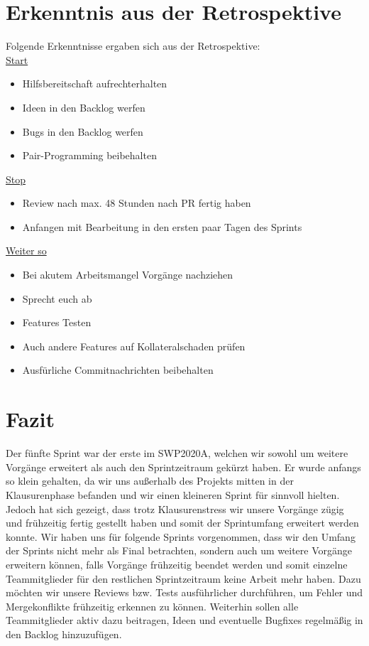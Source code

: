 \documentclass[12pt,a4paper, oneside]{article}
\begin{document}
    \section{Erkenntnis aus der Retrospektive}
    Folgende Erkenntnisse ergaben sich aus der Retrospektive:\\

    \underline{Start}
    \begin{itemize}
        \item Hilfsbereitschaft aufrechterhalten
        \item Ideen in den Backlog werfen
        \item Bugs in den Backlog werfen
        \item Pair-Programming beibehalten
        \\
    \end{itemize}

    \underline{Stop}
    \begin{itemize}
        \item Review nach max. 48 Stunden nach PR fertig haben
        \item Anfangen mit Bearbeitung in den ersten paar Tagen des Sprints
        \\
    \end{itemize}

    \underline{Weiter so}
    \begin{itemize}
        \item Bei akutem Arbeitsmangel Vorgänge nachziehen
        \item Sprecht euch ab
        \item Features Testen
        \item Auch andere Features auf Kollateralschaden prüfen
        \item Ausfürliche Commitnachrichten beibehalten
        \\
    \end{itemize}


    \section{Fazit}
    Der fünfte Sprint war der erste im SWP2020A, welchen wir sowohl um weitere Vorgänge erweitert als auch den Sprintzeitraum gekürzt haben. Er wurde anfangs so klein gehalten, da wir uns außerhalb des Projekts mitten in der Klausurenphase befanden und wir einen kleineren Sprint für sinnvoll hielten. Jedoch hat sich gezeigt, dass trotz Klausurenstress wir unsere Vorgänge zügig und frühzeitig fertig gestellt haben und somit der Sprintumfang erweitert werden konnte.
    Wir haben uns für folgende Sprints vorgenommen, dass wir den Umfang der Sprints nicht mehr als Final betrachten, sondern auch um weitere Vorgänge erweitern können, falls Vorgänge frühzeitig beendet werden und somit einzelne Teammitglieder für den restlichen Sprintzeitraum keine Arbeit mehr haben.
    Dazu möchten wir unsere Reviews bzw. Tests ausführlicher durchführen, um Fehler und Mergekonflikte frühzeitig erkennen zu können.
    Weiterhin sollen alle Teammitglieder aktiv dazu beitragen, Ideen und eventuelle Bugfixes regelmäßig in den Backlog hinzuzufügen.
\end{document}
